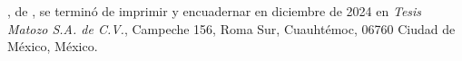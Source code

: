 \newpage

\vspace*{\fill}

\begin{center}
    \parbox{200pt}{\centering
        \newthought{\thetitle}, de \theauthor, se terminó de imprimir y encuadernar en diciembre de 2024 en \emph{Tesis Matozo S.A. de C.V.}, Campeche 156, Roma Sur, Cuauhtémoc, 06760 Ciudad de México, México.
    }
\end{center}

\vspace*{\fill}